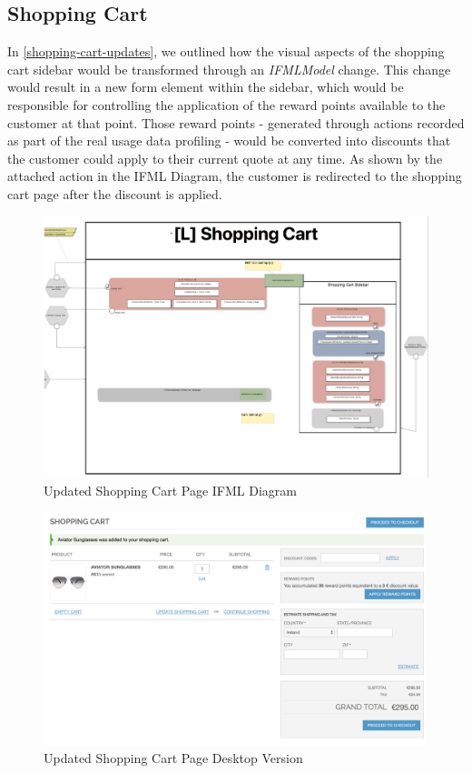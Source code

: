 \newpage
\subsection{Shopping Cart}

In \ref{shopping-cart-updates}, we outlined how the visual aspects of the shopping cart sidebar would be transformed through an \textit{IFMLModel} change. This change would result in a new form element within the sidebar, which would be responsible for controlling the application of the reward points available to the customer at that point. Those reward points - generated through actions recorded as part of the real usage data profiling - would be converted into discounts that the customer could apply to their current quote at any time. As shown by the attached action in the IFML Diagram, the customer is redirected to the shopping cart page after the discount is applied.

\vspace{0.5cm}
\begin{figure}[H]
  \centering
    \includegraphics[width=14cm]{images/diagrams/after/ifml-shopping-cart.png}
  \caption{Updated Shopping Cart Page IFML Diagram}
  \label{fig:ifml-after-shopping-cart}
\end{figure}

\begin{figure}[H]
  \centering
    \includegraphics[width=14cm]{images/diagrams/after/desktop-shopping-cart.png}
  \caption{Updated Shopping Cart Page Desktop Version}
  \label{fig:desktop-after-shopping-cart}
\end{figure}
\vspace{0.5cm}

